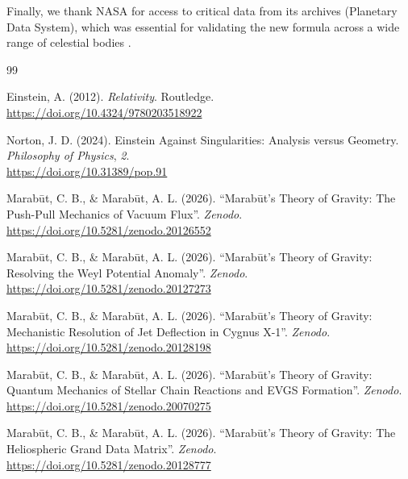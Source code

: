 \documentclass[11pt, a4paper]{article}
\begin{document}
Finally, we thank NASA for access to critical data from its archives (Planetary Data System), which was essential for validating the new formula across a wide range of celestial bodies \cite{nasa2024}.

\clearpage
\begin{thebibliography}{99}

  Einstein, A. (2012). \textit{Relativity}. Routledge. \\ \url{https://doi.org/10.4324/9780203518922}

  Norton, J. D. (2024). Einstein Against Singularities: Analysis versus Geometry. \textit{Philosophy of Physics}, \textit{2}. \\ \url{https://doi.org/10.31389/pop.91}

  Marab\={u}t, C. B., \& Marab\={u}t, A. L. (2026). ``Marab\={u}t's Theory of Gravity: The Push-Pull Mechanics of Vacuum Flux''. \textit{Zenodo}. \\ \url{https://doi.org/10.5281/zenodo.20126552}

  Marab\={u}t, C. B., \& Marab\={u}t, A. L. (2026). ``Marab\={u}t's Theory of Gravity: Resolving the Weyl Potential Anomaly''. \textit{Zenodo}. \\ \url{https://doi.org/10.5281/zenodo.20127273}

  Marab\={u}t, C. B., \& Marab\={u}t, A. L. (2026). ``Marab\={u}t's Theory of Gravity: Mechanistic Resolution of Jet Deflection in Cygnus X-1''. \textit{Zenodo}. \\ \url{https://doi.org/10.5281/zenodo.20128198}

  Marab\={u}t, C. B., \& Marab\={u}t, A. L. (2026). ``Marab\={u}t's Theory of Gravity: Quantum Mechanics of Stellar Chain Reactions and EVGS Formation''. \textit{Zenodo}. \\ \url{https://doi.org/10.5281/zenodo.20070275}

  Marab\={u}t, C. B., \& Marab\={u}t, A. L. (2026). ``Marab\={u}t's Theory of Gravity: The Heliospheric Grand Data Matrix''. \textit{Zenodo}. \\ \url{https://doi.org/10.5281/zenodo.20128777}


\end{thebibliography}
\end{document}
